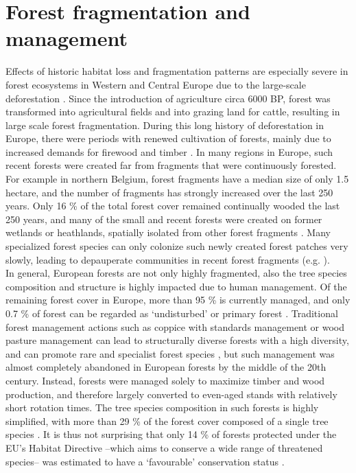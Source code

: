 \documentclass[10pt, twoside]{book} %
\begin{document}
	\section{Forest fragmentation and management}
	
Effects of historic habitat loss and fragmentation patterns are especially severe in forest ecosystems in Western and Central Europe due to the large-scale deforestation \citep{Bastrup-Birk2016}. Since the introduction of agriculture circa 6000 BP, forest was transformed into agricultural fields and into grazing land for cattle, resulting in large scale forest fragmentation. During this long history of deforestation in Europe, there were periods with renewed cultivation of forests, mainly due to increased demands for firewood and timber \citep{Tack1993}. In many regions in Europe, such recent forests were created far from fragments that were continuously forested. For example in northern Belgium, forest fragments have a median size of only 1.5 hectare, and the number of fragments has strongly increased over the last 250 years. Only 16 \% of the total forest cover remained continually wooded the last 250 years, and many of the small and recent forests were created on former wetlands or heathlands, spatially isolated from other forest fragments \citep{DeKeersmaeker2014}. Many specialized forest species can only colonize such newly created forest patches very slowly, leading to depauperate communities in recent forest fragments (e.g. \citealt{Desender1999, Honnay2002, Boeraeve2018}).\\

In general, European forests are not only highly fragmented, also the tree species composition and structure is highly impacted due to human management. Of the remaining forest cover in Europe, more than 95 \% is currently managed, and only 0.7 \% of forest can be regarded as `undisturbed' or primary forest \citep{Sabatini2018}. Traditional forest management actions such as coppice with standards management or wood pasture management can lead to structurally diverse forests with a high diversity, and can promote rare and specialist forest species \citep{Hedl2010, Mullerova2015, Vandekerkhove2016}, but such management was almost completely abandoned in European forests by the middle of the 20th century. Instead, forests were managed solely to maximize timber and wood production, and therefore largely converted to even-aged stands with relatively short rotation times. The tree species composition in such forests is highly simplified, with more than 29 \% of the forest cover composed of a single tree species \citep{Barsoum2016}. It is thus not surprising that only 14 \% of forests protected under the EU's Habitat Directive --which aims to conserve a wide range of threatened species-- was estimated to have a `favourable' conservation status \citep{EEA2020}.\\
\end{document}
